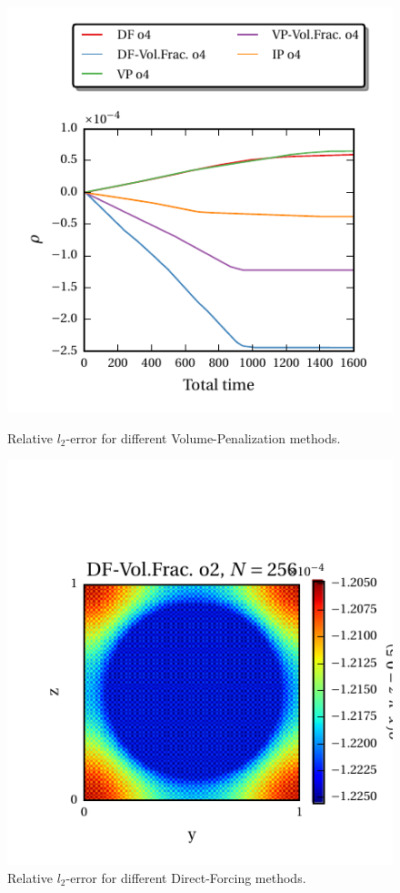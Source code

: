 \begin{figure}[!bp]
  \begin{minipage}[c]{0.5\textwidth}
      \includegraphics{gfx/immersed_boundary/hpflow/long/ts.pdf}
      \caption{Relative $l_2$-error for different Volume-Penalization methods.}
  \end{minipage}
  \begin{minipage}[c]{0.5\textwidth}
      \includegraphics{gfx/immersed_boundary/hpflow/long/example.pdf}
      \caption{Relative $l_2$-error for different Direct-Forcing methods.}
  \end{minipage}
\end{figure}


